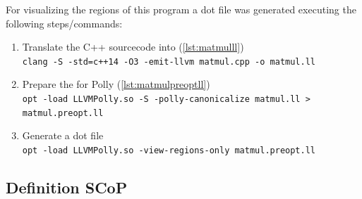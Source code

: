 For visualizing the regions of this program a dot file was generated executing the following steps/commands:
\begin{enumerate}
    \item Translate the C++ sourcecode into \llvmir (\autoref{lst:matmulll})\\
        \texttt{clang -S -std=c++14 -O3 -emit-llvm matmul.cpp -o matmul.ll}
    \item Prepare the \llvmir for Polly (\autoref{lst:matmulpreoptll})\\
        \texttt{opt -load LLVMPolly.so -S -polly-canonicalize matmul.ll > matmul.preopt.ll}
    \item Generate a dot file\\
        \texttt{opt -load LLVMPolly.so -view-regions-only matmul.preopt.ll}
\end{enumerate}
\subsection{Definition SCoP}
